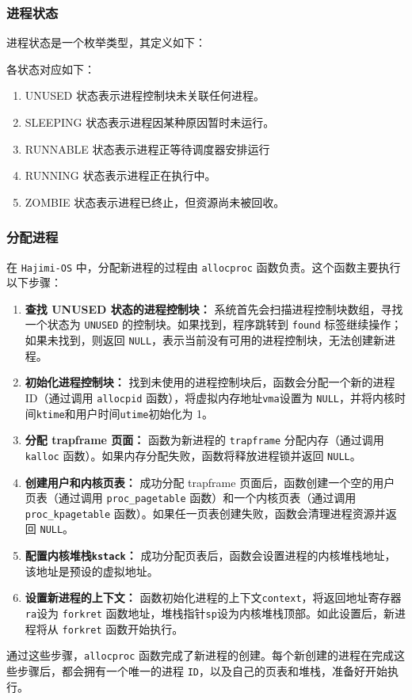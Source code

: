 \documentclass[UTF8]{article}
\begin{document}
\subsubsection{进程状态}
进程状态是一个枚举类型，其定义如下：

各状态对应如下：
\begin{enumerate}[label=\textbf{\arabic*}., wide, labelwidth=!, labelindent=0pt]
  \item UNUSED 状态表示进程控制块未关联任何进程。
  \item SLEEPING 状态表示进程因某种原因暂时未运行。
  \item RUNNABLE 状态表示进程正等待调度器安排运行
  \item RUNNING 状态表示进程正在执行中。
  \item ZOMBIE 状态表示进程已终止，但资源尚未被回收。
\end{enumerate}
\subsubsection{分配进程}
在 \texttt{Hajimi-OS} 中，分配新进程的过程由 \texttt{allocproc} 函数负责。这个函数主要执行以下步骤：
\begin{enumerate}[label=\textbf{\arabic*}., wide, labelwidth=!, labelindent=0pt]
  \item \textbf{查找 UNUSED 状态的进程控制块：} 系统首先会扫描进程控制块数组，寻找一个状态为 \texttt{UNUSED} 的控制块。如果找到，程序跳转到 \texttt{found} 标签继续操作；如果未找到，则返回 \texttt{NULL}，表示当前没有可用的进程控制块，无法创建新进程。
  \item \textbf{初始化进程控制块：} 找到未使用的进程控制块后，函数会分配一个新的进程 ID（通过调用 \texttt{allocpid} 函数），将虚拟内存地址\texttt{vma}设置为 \texttt{NULL}，并将内核时间\texttt{ktime}和用户时间\texttt{utime}初始化为 1。
  \item \textbf{分配 trapframe 页面：} 函数为新进程的 \texttt{trapframe} 分配内存（通过调用 \texttt{kalloc} 函数）。如果内存分配失败，函数将释放进程锁并返回 \texttt{NULL}。
  \item \textbf{创建用户和内核页表：} 成功分配 trapframe 页面后，函数创建一个空的用户页表（通过调用 \texttt{proc\_pagetable} 函数）和一个内核页表（通过调用 \texttt{proc\_kpagetable} 函数）。如果任一页表创建失败，函数会清理进程资源并返回 \texttt{NULL}。
  \item \textbf{配置内核堆栈\texttt{kstack}：} 成功分配页表后，函数会设置进程的内核堆栈地址，该地址是预设的虚拟地址。
  \item \textbf{设置新进程的上下文：} 函数初始化进程的上下文\texttt{context}，将返回地址寄存器\texttt{ra}设为 \texttt{forkret} 函数地址，堆栈指针\texttt{sp}设为内核堆栈顶部。如此设置后，新进程将从 \texttt{forkret} 函数开始执行。
\end{enumerate}
通过这些步骤，\texttt{allocproc} 函数完成了新进程的创建。每个新创建的进程在完成这些步骤后，都会拥有一个唯一的进程 \texttt{ID}，以及自己的页表和堆栈，准备好开始执行。
\end{document}
